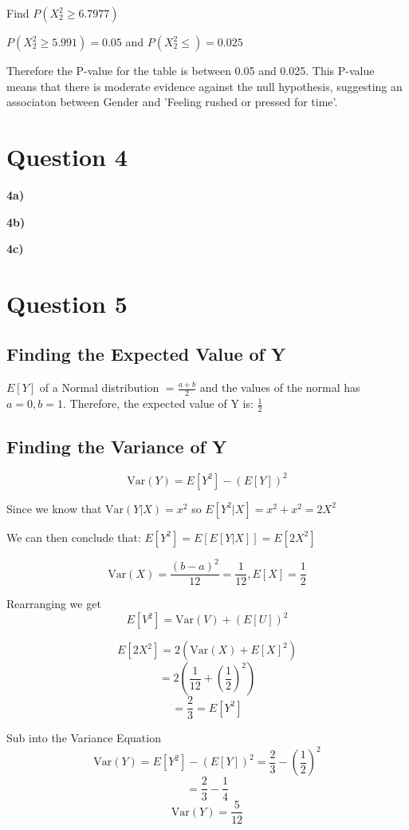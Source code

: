 \documentclass[oneside, a4paper]{article}
\begin{document}
Find $P(X^2_{2} \geq 6.7977)$

$P(X^2_2 \geq 5.991) = 0.05$ and $P(X^2_2 \leq ) = 0.025$

Therefore the P-value for the table is between 0.05 and 0.025. This P-value means that there is moderate evidence against the null hypothesis, suggesting an associaton between Gender and 'Feeling rushed or pressed for time'.

\newpage
\section{Question 4}

\textbf{4a)}


\textbf{4b)}



\textbf{4c)}



\section{Question 5}

\subsection{Finding the Expected Value of Y}
$E[Y]$ of a Normal distribution $ = \frac{a+b}{2}$ and the values of the normal has $ a = 0, b = 1$. Therefore, the expected value of Y is: $\frac{1}{2}$

\subsection{Finding the Variance of Y}

\begin{center}
    $$\newcommand{\Var}{\mathrm{Var}} \Var(Y) = E[Y^2] - (E[Y])^2$$

    Since we know that $\newcommand{\Var}{\mathrm{Var}} \Var(Y|X) = x^2$ so $E[Y^2|X] = x^2 + x^2 = 2X^2$

    We can then conclude that: $E[Y^2] = E[E[Y|X]] = E[2X^2]$

    $$ \newcommand{\Var}{\mathrm{Var}} \Var(X) = \frac{(b-a)^2}{12} = \frac{1}{12} , E[X] = \frac{1}{2}$$

    Rearranging we get
    $$ \newcommand{\Var}{\mathrm{Var}} E[V^2] = \Var(V) + (E[U])^2$$

    $$\newcommand{\Var}{\mathrm{Var}} E[2X^2] = 2\left(\Var(X) + E[X]^2\right)$$
    $$ = 2\left(\frac{1}{12} + \left(\frac{1}{2}\right)^2\right)$$
    $$ = \frac{2}{3} = E[Y^2]$$

    Sub into the Variance Equation
    $$ \newcommand{\Var}{\mathrm{Var}} \Var(Y) = E[Y^2] - (E[Y])^2 = \frac{2}{3} - \left(\frac{1}{2}\right)^2$$
    $$ = \frac{2}{3} - \frac{1}{4} $$
    $$ \newcommand{\Var}{\mathrm{Var}} \Var(Y) = \frac{5}{12}$$
\end{center}
\end{document}
